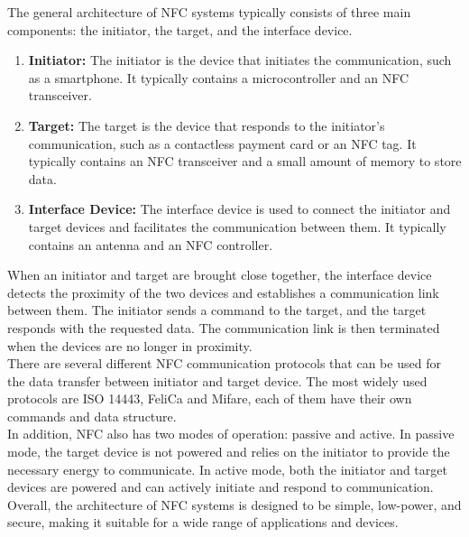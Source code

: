 \documentclass[12pt,a4paper]{article}
\begin{document}
The general architecture of NFC systems typically consists of three main components: the initiator, the target, and the interface device.
\begin{enumerate}
    \item \textbf{Initiator:} The initiator is the device that initiates the communication, such as a smartphone. It typically contains a microcontroller and an NFC transceiver.
    \item \textbf{Target:} The target is the device that responds to the initiator's communication, such as a contactless payment card or an NFC tag. It typically contains an NFC transceiver and a small amount of memory to store data.
    \item \textbf{Interface Device:} The interface device is used to connect the initiator and target devices and facilitates the communication between them. It typically contains an antenna and an NFC controller.
\end{enumerate}

When an initiator and target are brought close together, the interface device detects the proximity of the two devices and establishes a communication link between them. The initiator sends a command to the target, and the target responds with the requested data. The communication link is then terminated when the devices are no longer in proximity. \\

There are several different NFC communication protocols that can be used for the data transfer between initiator and target device. The most widely used protocols are ISO 14443, FeliCa and Mifare, each of them have their own commands and data structure. \\ 

In addition, NFC also has two modes of operation: passive and active. In passive mode, the target device is not powered and relies on the initiator to provide the necessary energy to communicate. In active mode, both the initiator and target devices are powered and can actively initiate and respond to communication. \\ 

Overall, the architecture of NFC systems is designed to be simple, low-power, and secure, making it suitable for a wide range of applications and devices.

\end{document}
